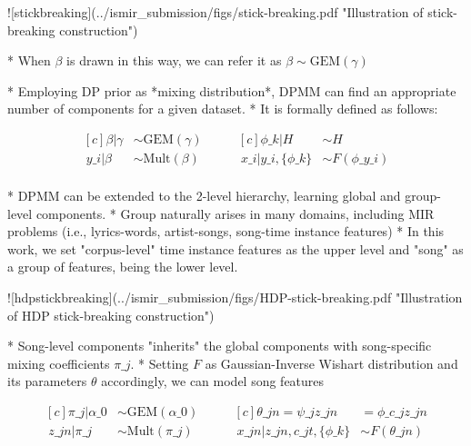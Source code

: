 \documentclass{beamer}
\begin{document}
\begin{frame}[fragile]
\begin{columns}[T]
\begin{column}{.46\textwidth}
\begin{markdown}
![stickbreaking](../ismir_submission/figs/stick-breaking.pdf "Illustration of stick-breaking construction")

* When $\beta$ is drawn in this way, we can refer it as $\beta \sim \text{GEM}(\gamma)$

* Employing DP prior as *mixing distribution*, DPMM can find an appropriate number of components for a given dataset.
* It is formally defined as follows:

\begin{equation}
\begin{aligned}[c]
    \beta|\gamma &\sim \text{GEM}(\gamma) \\\
    y\_{i}|\beta &\sim \text{Mult}(\beta) \\\
\end{aligned}
\qquad
\begin{aligned}[c]
    \phi\_{k}|H &\sim H \\\
    x\_{i}|y\_{i},\{\phi\_{k}\} &\sim F(\phi\_{y\_{i}}) \\\
\end{aligned}
\end{equation}


* DPMM can be extended to the 2-level hierarchy, learning global and group-level components.
* Group naturally arises in many domains, including MIR problems (i.e., lyrics-words, artist-songs, song-time instance features)
* In this work, we set "corpus-level" time instance features as the upper level and "song" as a group of features, being the lower level.

\setkeys{Gin}{width=.6\linewidth}
![hdpstickbreaking](../ismir_submission/figs/HDP-stick-breaking.pdf "Illustration of HDP stick-breaking construction")

* Song-level components "inherits" the global components with song-specific mixing coefficients $\pi\_{j}$.
* Setting $F$ as Gaussian-Inverse Wishart distribution and its parameters $\theta$ accordingly, we can model song features 

\begin{equation}
\begin{aligned}[c]
    \pi\_{j}|\alpha\_{0} &\sim \text{GEM}(\alpha\_{0}) \\\
    z\_{jn}|\pi\_{j} &\sim \text{Mult}(\pi\_{j})
\end{aligned}
\qquad
\begin{aligned}[c]
    \theta\_{jn} = \psi\_{jz\_{jn}} &= \phi\_{c\_{jz\_{jn}}}  \\\
    x\_{jn}|z\_{jn}, c\_{jt}, \{\phi\_{k}\} &\sim F(\theta\_{jn}) 
\end{aligned}
\end{equation}


\end{markdown}
\end{column}
\end{columns}
\end{frame}
\end{document}
